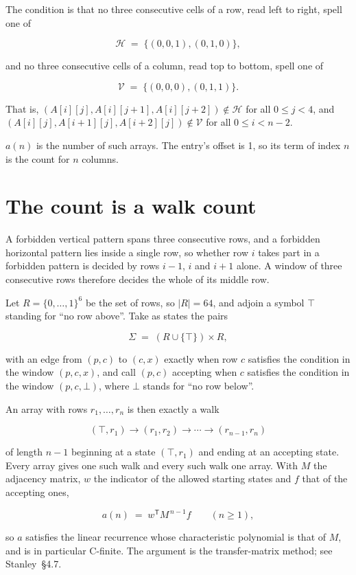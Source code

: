 \documentclass[11pt]{article}
\theoremstyle{definition}
\begin{document}
The condition is that no three consecutive cells of a row, read left to right, spell one of

\[\mathcal{H} \;=\; \{(0,0,1), (0,1,0)\},\]

and no three consecutive cells of a column, read top to bottom, spell one of

\[\mathcal{V} \;=\; \{(0,0,0), (0,1,1)\}.\]

That is, $(A[i][j],A[i][j{+}1],A[i][j{+}2]) \notin \mathcal{H}$ for all $0 \le j < 4$, and $(A[i][j],A[i{+}1][j],A[i{+}2][j]) \notin \mathcal{V}$ for all $0 \le i < n-2$.

$a(n)$ is the number of such arrays. The entry's offset is 1, so its term of index $n$ is the count for $n$ columns.

\section{The count is a walk count}

A forbidden vertical pattern spans three consecutive rows, and a forbidden horizontal pattern lies inside a single row, so whether row $i$ takes part in a forbidden pattern is decided by rows $i-1$, $i$ and $i+1$ alone. A window of three consecutive rows therefore decides the whole of its middle row.

Let $R = \{0,\dots,1\}^{6}$ be the set of rows, so $|R| = 64$, and adjoin a symbol $\top$ standing for ``no row above''. Take as states the pairs

\[\Sigma \;=\; (R \cup \{\top\}) \times R,\]

with an edge from $(p,c)$ to $(c,x)$ exactly when row $c$ satisfies the condition in the window $(p,c,x)$, and call $(p,c)$ accepting when $c$ satisfies the condition in the window $(p,c,\bot)$, where $\bot$ stands for ``no row below''.

An array with rows $r_1,\dots,r_n$ is then exactly a walk

\[(\top,r_1) \to (r_1,r_2) \to \cdots \to (r_{n-1},r_n)\]

of length $n-1$ beginning at a state $(\top,r_1)$ and ending at an accepting state. Every array gives one such walk and every such walk one array. With $M$ the adjacency matrix, $w$ the indicator of the allowed starting states and $f$ that of the accepting ones,

\[a(n) \;=\; w^{\mathsf T} M^{\,n-1} f \qquad (n \ge 1),\]

so $a$ satisfies the linear recurrence whose characteristic polynomial is that of $M$, and is in particular C-finite. The argument is the transfer-matrix method; see Stanley~\S4.7.
\end{document}
